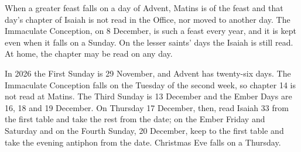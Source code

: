 When a greater feast falls on a day of Advent, Matins is of the feast and that day's chapter of
Isaiah is not read in the Office, nor moved to another day. The Immaculate Conception, on 8
December, is such a feast every year, and it is kept even when it falls on a Sunday. On the lesser
saints' days the Isaiah is still read. At home, the chapter may be read on any day.

In 2026 the First Sunday is 29 November, and Advent has twenty-six days. The Immaculate Conception
falls on the Tuesday of the second week, so chapter 14 is not read at Matins. The Third Sunday is 13
December and the Ember Days are 16, 18 and 19 December. On Thursday 17 December, then, read Isaiah
33 from the first table and take the rest from the date; on the Ember Friday and Saturday and on
the Fourth Sunday, 20 December, keep to the first table and take the evening antiphon from the
date. Christmas Eve falls on a Thursday.
